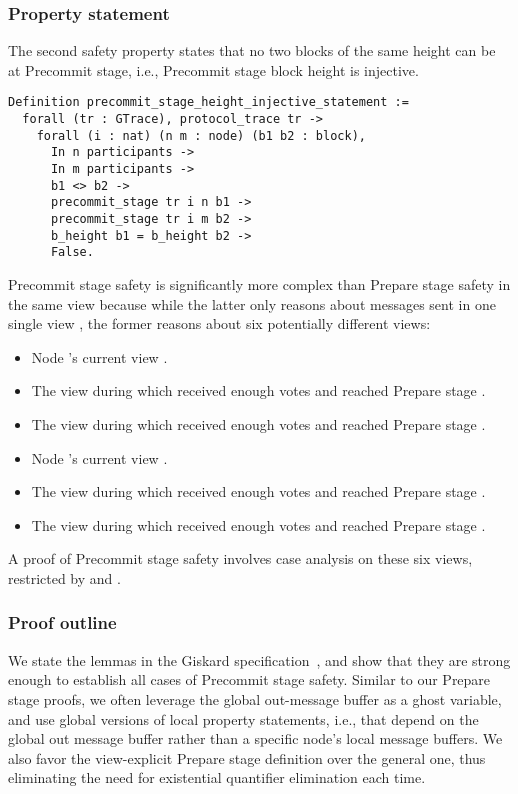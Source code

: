 \documentclass{easychair}
\begin{document}
\subsubsection{Property statement}
The second safety property states that no two blocks of the same height can be at Precommit stage, i.e., Precommit stage block height is injective. 
\begin{lstlisting}[language=Coq]
Definition precommit_stage_height_injective_statement :=
  forall (tr : GTrace), protocol_trace tr ->
    forall (i : nat) (n m : node) (b1 b2 : block),
      In n participants ->
      In m participants ->
      b1 <> b2 ->
      precommit_stage tr i n b1 ->
      precommit_stage tr i m b2 ->
      b_height b1 = b_height b2 ->
      False.
\end{lstlisting}

Precommit stage safety is significantly more complex than Prepare stage safety in the same view because while the latter only reasons about messages sent in one single view , the former reasons about six potentially different views: 
\begin{itemize}[leftmargin=*]
\setlength\itemsep{-0.4em}  
    \item Node 's current view .
    \item The view during which  received enough votes and reached Prepare stage . 
    \item The view during which  received enough votes and reached Prepare stage .
    \item Node 's current view .
    \item The view during which  received enough votes and reached Prepare stage . 
    \item The view during which  received enough votes and reached Prepare stage .  
\end{itemize}

A proof of Precommit stage safety involves case analysis on these six views, restricted by  and .  

\subsubsection{Proof outline}
We state the lemmas in the Giskard specification~\cite{GiskardSpec}, and show that they are strong enough to establish all cases of Precommit stage safety. Similar to our Prepare stage proofs, we often leverage the global out-message buffer as a ghost variable, and use global versions of local property statements, i.e., that depend on the global out message buffer rather than a specific node's local message buffers. We also favor the view-explicit Prepare stage definition over the general one, thus eliminating the need for existential quantifier elimination each time. 
\end{document}
